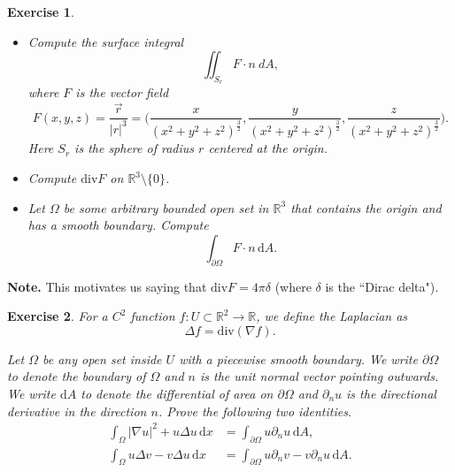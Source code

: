 \documentclass{article}
\newtheorem{q}{Exercise}
\newcommand{\R}{\mathbb R}
\newcommand{\dd}{\mathrm d}
\newcommand{\note}{\noindent \textbf{Note. }}
\begin{document}
\begin{q} \hfill \\
\begin{itemize}
\item[(a)] Compute the surface integral \[\iint_{S_r}F\cdot n\:dA,\] where $F$ is the vector field
\begin{equation*}
F(x,y,z)=\frac{\vec{r}}{|r|^3}=\bigg(\frac{x}{(x^2+y^2+z^2)^\frac{3}{2}},\frac{y}{(x^2+y^2+z^2)^\frac{3}{2}},\frac{z}{(x^2+y^2+z^2)^\frac{3}{2}}\bigg).
\end{equation*}
Here $S_r$ is the sphere of radius $r$ centered at the origin.
\item[(b)] Compute $\mathrm{div} F$ on $\mathbb{R}^3\setminus\{0\}$.
\item[(c)] Let $\Omega$ be some arbitrary bounded open set in $\R^3$ that contains the origin and has a smooth boundary. Compute
\begin{equation*}
\int_{\partial \Omega}F\cdot n \, \dd A.
\end{equation*}
\end{itemize}
\end{q}
\note This motivates us saying that $\mathrm{div}F=4\pi\delta$ (where $\delta$ is the ``Dirac delta").

\begin{q}
For a $C^2$ function $f:U\subset\mathbb{R}^2\rightarrow\mathbb{R}$, we define the Laplacian as
\begin{equation*}
\Delta f=\mathrm{div}(\nabla f).
\end{equation*}

Let $\Omega$ be any open set inside $U$ with a piecewise smooth boundary. We write $\partial\Omega$ to denote the boundary of $\Omega$ and $n$ is the unit normal vector pointing outwards. We write $\dd A$ to denote the differential of area on $\partial \Omega$ and $\partial_n u$ is the directional derivative in the direction $n$. Prove the following two identities.
\begin{align*}
\int_\Omega |\nabla u|^2 + u \Delta u \, \dd x &= \int_{\partial \Omega} u \partial_n u \, \dd A, \\
\int_\Omega u \Delta v - v \Delta u \, \dd x &= \int_{\partial \Omega} u \partial_n v - v \partial_n u \, \dd A.
\end{align*}

\end{q}
\end{document}
